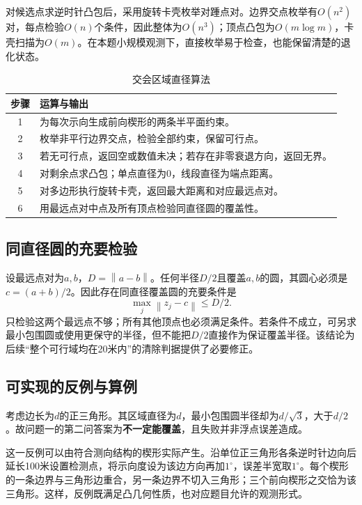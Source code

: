 \documentclass[UTF8,a4paper,12pt,fontset=fandol]{ctexart}
\newcommand{\norm}[1]{\left\lVert#1\right\rVert}
\newcommand{\nextpage}{\clearpage}
\begin{document}
对候选点求逆时针凸包后，采用旋转卡壳枚举对踵点对\cite{toussaint}。边界交点枚举有$O(n^2)$对，每点检验$O(n)$个条件，因此整体为$O(n^3)$；顶点凸包为$O(m\log m)$，卡壳扫描为$O(m)$。在本题小规模观测下，直接枚举易于检查，也能保留清楚的退化状态。

\begin{table}[H]\centering\caption{交会区域直径算法}\small
\begin{tabularx}{\linewidth}{cY}\toprule
步骤 & 运算与输出\\ & 为每次示向生成前向楔形的两条半平面约束。\\
2 & 枚举非平行边界交点，检验全部约束，保留可行点。\\
3 & 若无可行点，返回空或数值未决；若存在非零衰退方向，返回无界。\\
4 & 对剩余点求凸包；单点直径为0，线段直径为端点距离。\\
5 & 对多边形执行旋转卡壳，返回最大距离和对应最远点对。\\
6 & 用最远点对中点及所有顶点检验同直径圆的覆盖性。\\\bottomrule
\end{tabularx}\end{table}

\subsection{同直径圆的充要检验}
设最远点对为$a,b$，$D=\norm{a-b}$。任何半径$D/2$且覆盖$a,b$的圆，其圆心必须是$c=(a+b)/2$。因此存在同直径覆盖圆的充要条件是
\begin{equation}\label{eq:diametercircle}
 \max_j\norm{z_j-c}\le D/2.
\end{equation}
只检验这两个最远点不够；所有其他顶点也必须满足条件。若条件不成立，可另求最小包围圆或使用更保守的半径，但不能把$D/2$直接作为保证覆盖半径。该结论为后续“整个可行域均在20米内”的清除判据提供了必要修正。

\nextpage
\subsection{可实现的反例与算例}
考虑边长为$d$的正三角形。其区域直径为$d$，最小包围圆半径却为$d/\sqrt3$，大于$d/2$。故问题一的第二问答案为\textbf{不一定能覆盖}，且失败并非浮点误差造成。

这一反例可以由符合测向结构的楔形实际产生。沿单位正三角形各条逆时针边向后延长100米设置检测点，将示向度设为该边方向再加$1^\circ$，误差半宽取$1^\circ$。每个楔形的一条边界与三角形边重合，另一条边界不切入三角形；三个前向楔形之交恰为该三角形。这样，反例既满足凸几何性质，也对应题目允许的观测形式。
\end{document}
